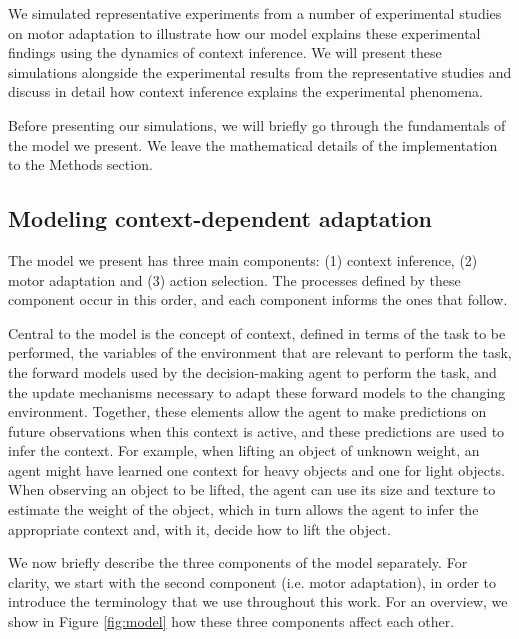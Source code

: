 \documentclass[a4paper,doc,floatsintext,natbib]{apa6}%
\def \fref #1{Figure \ref{#1}}     %
\begin{document}
We simulated representative experiments from a number of experimental studies on motor adaptation to illustrate how our model explains these experimental findings using the dynamics of context inference. We will present these simulations alongside the experimental results from the representative studies and discuss in detail how context inference explains the experimental phenomena.

Before presenting our simulations, we will briefly go through the fundamentals of the model we present. We leave the mathematical details of the implementation to the Methods section.

\subsection{Modeling context-dependent adaptation}
The model we present has three main components: (1) context inference, (2) motor adaptation and (3) action selection. The processes defined by these component occur in this order, and each component informs the ones that follow.

Central to the model is the concept of context, defined in terms of the task to be performed, the variables of the environment that are relevant to perform the task, the forward models used by the decision-making agent to perform the task, and the update mechanisms necessary to adapt these forward models to the changing environment. Together, these elements allow the agent to make predictions on future observations when this context is active, and these predictions are used to infer the context. For example, when lifting an object of unknown weight, an agent might have learned one context for heavy objects and one for light objects. When observing an object to be lifted, the agent can use its size and texture to estimate the weight of the object, which in turn allows the agent to infer the appropriate context and, with it, decide how to lift the object.

We now briefly describe the three components of the model separately. For clarity, we start with the second component (i.e. motor adaptation), in order to introduce the terminology that we use throughout this work. For an overview, we show in \fref{fig:model} how these three components affect each other.
\end{document}
